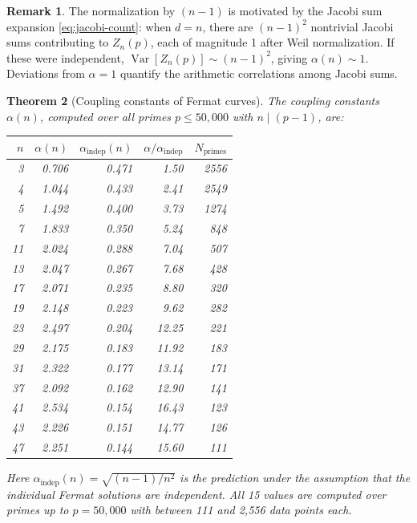 \documentclass[11pt]{amsart}
\newtheorem{theorem}{Theorem}[section]
\theoremstyle{definition}
\newtheorem{remark}[theorem]{Remark}
\begin{document}
\begin{remark}
The normalization by $(n-1)$ is motivated by the Jacobi sum expansion \eqref{eq:jacobi-count}: when $d = n$, there are $(n-1)^2$ nontrivial Jacobi sums contributing to $Z_n(p)$, each of magnitude 1 after Weil normalization. If these were independent, $\operatorname{Var}[Z_n(p)] \sim (n-1)^2$, giving $\alpha(n) \sim 1$. Deviations from $\alpha = 1$ quantify the arithmetic correlations among Jacobi sums.
\end{remark}

\begin{theorem}[Coupling constants of Fermat curves]\label{thm:coupling}
The coupling constants $\alpha(n)$, computed over all primes $p \leq 50{,}000$ with $n \mid (p-1)$, are:

\begin{center}
\begin{tabular}{r r r r r}
\toprule
$n$ & $\alpha(n)$ & $\alpha_{\mathrm{indep}}(n)$ & $\alpha/\alpha_{\mathrm{indep}}$ & $N_{\mathrm{primes}}$ \\
\midrule
3 & 0.706 & 0.471 & 1.50 & 2556 \\
4 & 1.044 & 0.433 & 2.41 & 2549 \\
5 & 1.492 & 0.400 & 3.73 & 1274 \\
7 & 1.833 & 0.350 & 5.24 & 848 \\
11 & 2.024 & 0.288 & 7.04 & 507 \\
13 & 2.047 & 0.267 & 7.68 & 428 \\
17 & 2.071 & 0.235 & 8.80 & 320 \\
19 & 2.148 & 0.223 & 9.62 & 282 \\
23 & 2.497 & 0.204 & 12.25 & 221 \\
29 & 2.175 & 0.183 & 11.92 & 183 \\
31 & 2.322 & 0.177 & 13.14 & 171 \\
37 & 2.092 & 0.162 & 12.90 & 141 \\
41 & 2.534 & 0.154 & 16.43 & 123 \\
43 & 2.226 & 0.151 & 14.77 & 126 \\
47 & 2.251 & 0.144 & 15.60 & 111 \\
\bottomrule
\end{tabular}
\end{center}

\noindent Here $\alpha_{\mathrm{indep}}(n) = \sqrt{(n-1)/n^2}$ is the prediction under the assumption that the individual Fermat solutions are independent. All 15 values are computed over primes up to $p = 50{,}000$ with between 111 and 2{,}556 data points each.
\end{theorem}
\end{document}
